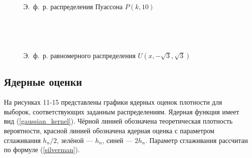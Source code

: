 \documentclass[12pt]{article}
\begin{document}
\newpage\begin{figure}[h!]
	\begin{center}
	\begin{minipage}[h]{0.65\linewidth}
	\end{minipage}
	\phantom{0}\\
	\begin{minipage}[h]{0.65\linewidth}
	\end{minipage}
	\phantom{0}\\
	\begin{minipage}[h]{0.65\linewidth}
	\end{minipage}
	\caption{Э.~ф.~р. распределения Пуассона $P(k, 10)$}
\end{center}
\end{figure}
\newpage\begin{figure}[h!]
	\begin{center}
	\begin{minipage}[h]{0.65\linewidth}
	\end{minipage}
	\phantom{0}\\
	\begin{minipage}[h]{0.65\linewidth}
	\end{minipage}
	\phantom{0}\\
	\begin{minipage}[h]{0.65\linewidth}
	\end{minipage}
	\caption{Э.~ф.~р. равномерного распределения $U(x, -\sqrt{3}, \sqrt{3})$}
\end{center}
\end{figure}
\newpage


\subsection{Ядерные оценки}
На рисунках 11-15 представлены графики ядерных оценок плотности для выборок, соответствующих заданным распределениям. Ядерная функция имеет вид (\ref{gaussian_kernel}). Чёрной линией обозначена теоретическая плотность вероятности, красной линией обозначена ядерная оценка с параметром сглаживания $h_n/2$, зелёной --- $h_n$, синей --- $2h_n$. Параметр сглаживания рассчитан по формуле (\ref{silverman}).
\end{document}
